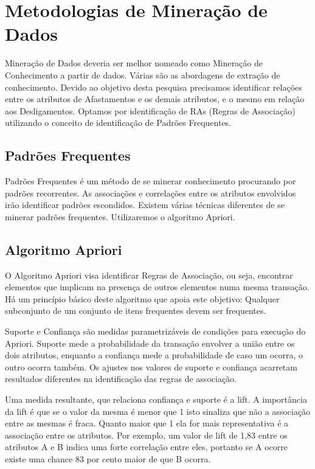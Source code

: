\documentclass[12pt]{article}
\begin{document}
\section{Metodologias de Mineração de Dados} 

Mineração de Dados deveria ser melhor nomeado como Mineração de Conhecimento a partir de dados. Várias são as abordagens de extração de conhecimento. Devido ao objetivo desta pesquisa  precisamos identificar relações entre os atributos de Afastamentos e os demais atributos, e o mesmo em relação aos Desligamentos. Optamos por identificação de RAs (Regras de Associação) utilizando o conceito de identificação de Padrões Frequentes.

\subsection{Padrões Frequentes}

Padrões Frequentes é um método de se minerar conhecimento procurando por padrões recorrentes. As associações e correlações entre os atributos envolvidos irão identificar padrões escondidos.\cite{james2014introduction}
Existem várias técnicas diferentes de se minerar padrões frequentes. Utilizaremos o algoritmo Apriori.\cite{agrawal1994fast}


\subsection{Algoritmo Apriori}

O Algoritmo Apriori  visa identificar Regras de Associação, ou seja, encontrar elementos que implicam na presença de outros elementos numa mesma transação. Há um princípio básico deste algoritmo que apoia este objetivo: Qualquer subconjunto de um conjunto de itens frequentes devem ser frequentes.\cite{Han2012}

Suporte e Confiança são medidas parametrizáveis de condições para execução do Apriori. Suporte mede a probabilidade da transação envolver a união entre os dois atributos, enquanto a confiança mede a probabilidade de caso um ocorra, o outro ocorra também. Os ajustes nos valores de suporte e confiança acarretam resultados diferentes na identificação das regras de associação.

Uma medida resultante, que relaciona confiança e suporte é a lift.\cite{Han2007} A importância da lift é que se o valor da mesma é menor que 1 isto sinaliza que não a associação entre as mesmas é fraca. Quanto maior que 1 ela for mais representativa é a associação entre os atributos. Por exemplo, um valor de lift de 1,83  entre os atributos A e B indica uma forte correlação entre eles, portanto se A ocorre existe uma chance 83 por cento maior de que B ocorra.  
\end{document}
